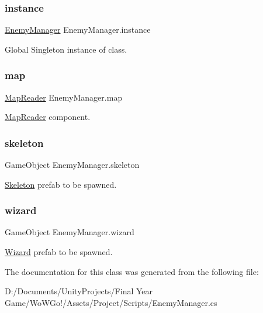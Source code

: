 \subsubsection{\texorpdfstring{instance}{instance}}
{\footnotesize\ttfamily \mbox{\hyperlink{class_enemy_manager}{Enemy\+Manager}} Enemy\+Manager.\+instance\hspace{0.3cm}{\ttfamily [static]}}



Global Singleton instance of class. 

\mbox{\label{class_enemy_manager_acb5c779b01cdfa40fddf6d2377dab3c5}} 
\subsubsection{\texorpdfstring{map}{map}}
{\footnotesize\ttfamily \mbox{\hyperlink{class_map_reader}{Map\+Reader}} Enemy\+Manager.\+map\hspace{0.3cm}{\ttfamily [private]}}



\mbox{\hyperlink{class_map_reader}{Map\+Reader}} component. 

\mbox{\label{class_enemy_manager_a986d0a001378a0d35579cd956138b601}} 
\subsubsection{\texorpdfstring{skeleton}{skeleton}}
{\footnotesize\ttfamily Game\+Object Enemy\+Manager.\+skeleton}



\mbox{\hyperlink{class_skeleton}{Skeleton}} prefab to be spawned. 

\mbox{\label{class_enemy_manager_ad5167208aff00ff86822bdc4d723aaad}} 
\subsubsection{\texorpdfstring{wizard}{wizard}}
{\footnotesize\ttfamily Game\+Object Enemy\+Manager.\+wizard}



\mbox{\hyperlink{class_wizard}{Wizard}} prefab to be spawned. 



The documentation for this class was generated from the following file\+:\begin{DoxyCompactItemize}
\item 
D\+:/\+Documents/\+Unity\+Projects/\+Final Year Game/\+Wo\+W\+Go!/\+Assets/\+Project/\+Scripts/Enemy\+Manager.\+cs\end{DoxyCompactItemize}
